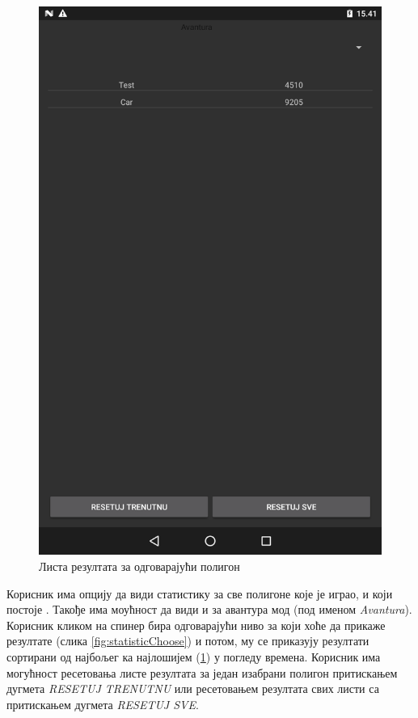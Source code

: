 \begin{figure}[htb!]
\begin{center}
\includegraphics[scale=.1]{pictures/statistics/HighScore}
\caption{Листа резултата за одговарајући полигон}\label{fig:statisticHighScore}
\end{center}
\end{figure}
Корисник има опцију да види статистику за све полигоне које је играо, и који постоје . Такође има моућност да види и за авантура мод (под именом \emph{Avantura}). Корисник кликом на спинер бира одговарајући ниво за који хоће да прикаже резултате (слика \ref{fig:statisticChoose}) и потом, му се приказују резултати сортирани од најбољег ка најлошијем (\ref{fig:statisticHighScore}) у погледу времена. Корисник има могућност ресетовања листе резултата за један изабрани полигон притискањем дугмета \emph{RESETUJ TRENUTNU} или ресетовањем резултата свих листи са притискањем дугмета \emph{RESETUJ SVE}.


